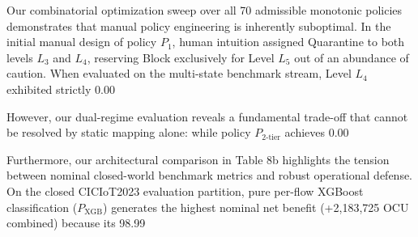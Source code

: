 \documentclass[journal,10pt,onecolumn]{IEEEtran}
\begin{document}
Our combinatorial optimization sweep over all 70 admissible monotonic policies demonstrates that manual policy engineering is inherently suboptimal. In the initial manual design of policy $P_1$, human intuition assigned Quarantine to both levels $L_3$ and $L_4$, reserving Block exclusively for Level $L_5$ out of an abundance of caution. When evaluated on the multi-state benchmark stream, Level $L_4$ exhibited strictly 0.00%

However, our dual-regime evaluation reveals a fundamental trade-off that cannot be resolved by static mapping alone: while policy $P_{2\text{-tier}}$ achieves 0.00%

Furthermore, our architectural comparison in Table 8b highlights the tension between nominal closed-world benchmark metrics and robust operational defense. On the closed CICIoT2023 evaluation partition, pure per-flow XGBoost classification ($P_{\text{XGB}}$) generates the highest nominal net benefit (+2,183,725 OCU combined) because its 98.99%
\end{document}

